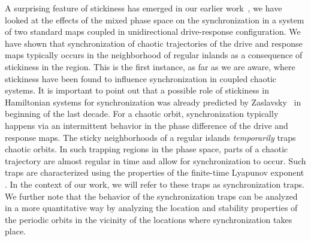 \documentclass[reprint,amsmath,amssymb,aps,pre]{revtex4-1}
\begin{document}
A surprising feature of stickiness has emerged in our earlier 
work~\cite{Mahata2016}, we have looked at the effects of the mixed phase space 
on the synchronization in a system of two standard maps coupled in 
unidirectional drive-response configuration. We have shown that 
synchronization of chaotic trajectories of the drive and response maps 
typically occurs in the neighborhood of regular inlands as a consequence of 
stickiness in the region.  This is the first instance, as far as we are aware, 
where stickiness have been found to influence synchronization in coupled 
chaotic systems. It is important to point out that a possible role of stickiness in 
Hamiltonian systems for synchronization was already predicted by 
Zaslavsky~\cite{Zaslavsky2002b} in beginning of the last decade.  For a chaotic 
orbit, synchronization typically happens via an intermittent behavior in the 
phase difference of the drive and response maps.   The sticky neighborhoods of 
a regular islands {\it temporarily} traps chaotic orbits. In such trapping 
regions in the phase space, parts of a  chaotic trajectory are almost regular 
in time and allow for synchronization to occur. Such traps are characterized 
using the properties of the finite-time Lyapunov exponent \cite{Szezech2005}. 
In the context of our work, we will refer to these traps as synchronization 
traps. We further note that the behavior of the synchronization traps can be 
analyzed in a more quantitative way by analyzing the location and stability 
properties of the periodic orbits in the vicinity of the locations where 
synchronization takes place.
\end{document}
